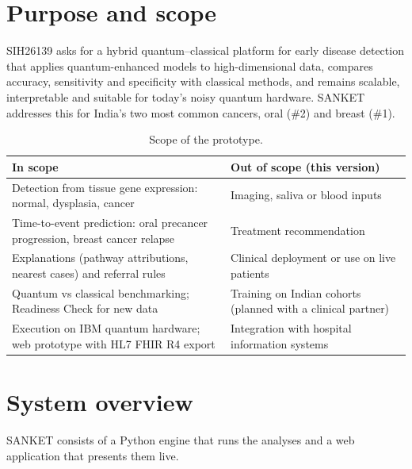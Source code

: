 \documentclass[11pt,a4paper]{article}
\begin{document}
\section{Purpose and scope}
SIH26139 asks for a hybrid quantum--classical platform for early disease detection that applies quantum-enhanced models to high-dimensional data, compares accuracy, sensitivity and specificity with classical methods, and remains scalable, interpretable and suitable for today's noisy quantum hardware. SANKET addresses this for India's two most common cancers, oral (\#2) and breast (\#1).

\begin{table}[H]
\centering
\caption{Scope of the prototype.}
\begin{tabularx}{\textwidth}{@{}Y Y@{}}
\toprule
\textbf{In scope} & \textbf{Out of scope (this version)} \\
\midrule
Detection from tissue gene expression: normal, dysplasia, cancer & Imaging, saliva or blood inputs \\
Time-to-event prediction: oral precancer progression, breast cancer relapse & Treatment recommendation \\
Explanations (pathway attributions, nearest cases) and referral rules & Clinical deployment or use on live patients \\
Quantum vs classical benchmarking; Readiness Check for new data & Training on Indian cohorts (planned with a clinical partner) \\
Execution on IBM quantum hardware; web prototype with HL7 FHIR R4 export & Integration with hospital information systems \\
\bottomrule
\end{tabularx}
\end{table}

\section{System overview}
SANKET consists of a Python engine that runs the analyses and a web application that presents them live.
\end{document}
